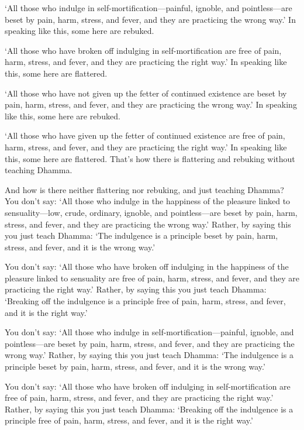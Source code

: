 \documentclass[12pt,openany]{book}%
\begin{document}
‘All those who indulge in self-mortification—painful, ignoble, and pointless—are beset by pain, harm, stress, and fever, and they are practicing the wrong way.’ In speaking like this, some here are rebuked. 

‘All those who have broken off indulging in self-mortification are free of pain, harm, stress, and fever, and they are practicing the right way.’ In speaking like this, some here are flattered. 

‘All those who have not given up the fetter of continued existence are beset by pain, harm, stress, and fever, and they are practicing the wrong way.’ In speaking like this, some here are rebuked. 

‘All those who have given up the fetter of continued existence are free of pain, harm, stress, and fever, and they are practicing the right way.’ In speaking like this, some here are flattered. That’s how there is flattering and rebuking without teaching Dhamma. 

And how is there neither flattering nor rebuking, and just teaching Dhamma? You don’t say: ‘All those who indulge in the happiness of the pleasure linked to sensuality—low, crude, ordinary, ignoble, and pointless—are beset by pain, harm, stress, and fever, and they are practicing the wrong way.’ Rather, by saying this you just teach Dhamma: ‘The indulgence is a principle beset by pain, harm, stress, and fever, and it is the wrong way.’ 

You don’t say: ‘All those who have broken off indulging in the happiness of the pleasure linked to sensuality are free of pain, harm, stress, and fever, and they are practicing the right way.’ Rather, by saying this you just teach Dhamma: ‘Breaking off the indulgence is a principle free of pain, harm, stress, and fever, and it is the right way.’ 

You don’t say: ‘All those who indulge in self-mortification—painful, ignoble, and pointless—are beset by pain, harm, stress, and fever, and they are practicing the wrong way.’ Rather, by saying this you just teach Dhamma: ‘The indulgence is a principle beset by pain, harm, stress, and fever, and it is the wrong way.’ 

You don’t say: ‘All those who have broken off indulging in self-mortification are free of pain, harm, stress, and fever, and they are practicing the right way.’ Rather, by saying this you just teach Dhamma: ‘Breaking off the indulgence is a principle free of pain, harm, stress, and fever, and it is the right way.’ 
\end{document}

